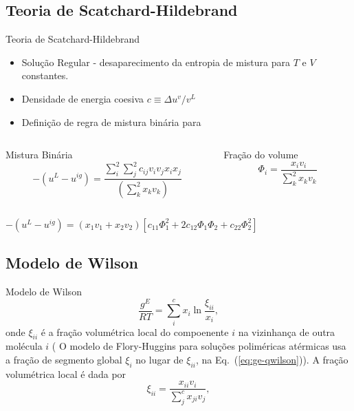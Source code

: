 \documentclass{beamer}
\begin{document}
\subsection{Teoria de Scatchard-Hildebrand}
\begin{frame}{Teoria de Scatchard-Hildebrand}
	\begin{itemize}
		\item Solução Regular - desaparecimento da entropia de mistura para $T$ e $V$ constantes.
		\item Densidade de energia coesiva $c \equiv \Delta u^v / v^L$
		\item Definição de regra de mistura binária para
	\end{itemize}
	\begin{columns}
		\begin{column}{6cm}
	\begin{block}{Mistura Binária}
	\begin{equation}
		-(u^{L} - u^{ig} )  = \frac{\sum_i^2 \sum_j^2 c_{ij}v_iv_jx_ix_j}{\left(\sum_k^2 x_k v_k \right)}
	\end{equation}
	\end{block}
		\end{column}
		\begin{column}{4cm}
			\begin{block}{Fração do volume}
                 \begin{equation}
                     \Phi_i = \frac{x_iv_i}{\sum_k^2 x_k v_k}
		 \end{equation}
			\end{block}
		\end{column}
	\end{columns}
	\begin{block}{ }
	$-(u^{L} - u^{ig} )  =  (x_1v_1 + x_2v_2)[c_{11}\Phi_{1}^2 + 2c_{12}\Phi_{1}\Phi_{2} + c_{22}\Phi_{2}^{2}]$
	\end{block}
\end{frame}

\subsection{Modelo de Wilson}

\begin{frame}{Modelo de Wilson}
%
\begin{equation}
\label{eq:ge-qwilson}
 \frac{g^E}{RT} = \sum_i^c x_i \ln \frac{\xi_{ii}}{x_i},
\end{equation}
%
onde $\xi_{ii}$  é a fração volumétrica local do compoenente $i$
na vizinhança de outra molécula $i$ 
( O modelo de Flory-Huggins para soluções poliméricas atérmicas 
usa a fração de segmento global $\xi_i$ no lugar de 
$\xi_{ii}$, na Eq.~(\ref{eq:ge-qwilson})).
%
A fração volumétrica local é dada por 
%
\begin{equation}
\label{eq:xi_ii}
 \xi_{ii}=\frac{x_{ii} v_i}{\sum_j^c x_{ji} v_j},
\end{equation}
%
\end{frame}
\end{document}
